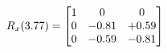 \documentclass[preview]{standalone}
\begin{document}
\begin{align*}
\special{dvisvgm:raw <g id='unique000'>}R_{x}(3.77) = \begin{bmatrix}1 & 0 & 0 \\0 & -0.81 & +0.59 \\0 & -0.59 & -0.81\end{bmatrix}\special{dvisvgm:raw </g>}
\end{align*}
\end{document}
